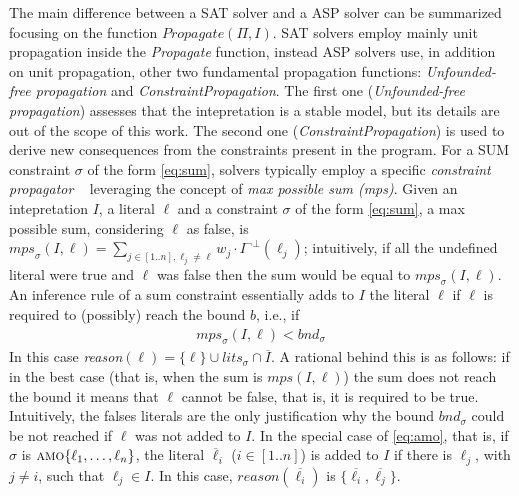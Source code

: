 The main difference between a SAT solver and a ASP solver can be summarized focusing on 
the function $\mathit{Propagate}(\Pi,I)$.
SAT solvers employ mainly unit propagation inside the \textit{Propagate} function,
instead ASP solvers use, in addition on unit propagation, other two fundamental  
propagation functions: \textit{Unfounded-free propagation} and \textit{ConstraintPropagation}.
The first one (\textit{Unfounded-free propagation}) assesses that the intepretation is a stable model, but its details
are out of the scope of this work.
The second one (\textit{ConstraintPropagation}) is used to derive new consequences from 
the constraints present in the program. 
For a SUM constraint $\sigma$ of the form \eqref{eq:sum},
solvers typically employ a 
specific \textit{constraint propagator}
~\cite{DBLP:conf/iclp/GebserKKS09,DBLP:journals/fuin/FaberLMR11} leveraging the concept of 
\textit{max possible sum (mps)}.
Given an intepretation $I$, a literal $\ell$ and a constraint $\sigma$ of the form \eqref{eq:sum}, 
a max possible sum, considering $\ell$ as false, is $\mathit{mps}_{\sigma}(I,\ell) = 
\sum_{j \in [1..n], \ell_j \neq \ell}{w_j \cdot I^{\neg\bot}(\ell_j)}$;
intuitively, if all the undefined literal were true and $\ell$ was false
then the sum would be equal to $\mathit{mps}_{\sigma}(I,\ell)$.
An inference rule of a sum constraint essentially adds to $I$ the literal $\ell$ 
if $\ell$ is required to (possibly) reach the bound $b$, i.e., if
\begin{align}\label{eq:sum:propagation}
    \mathit{mps}_{\sigma}(I,\ell) < \mathit{bnd}_{\sigma}
\end{align}
In this case \textit{reason}$(\ell) = \{\ell\} \cup lits_{\sigma} \cap \overline{I}$.
A rational behind this is as follows: if in the best case (that is, when the sum is $\mathit{mps}(I,\ell)$)
the sum does not reach the bound it means that $\ell$ cannot be false, that is, it is required to be true.
Intuitively, the falses literals are the only justification why the bound $\mathit{bnd}_{\sigma}$
could be not reached if $\ell$ was not added to $I$.
In the special case of \eqref{eq:amo}, that is, if $\sigma$ is $\textsc{amo}\{\ell_1, \ldots, \ell_n\}$, the literal $\overline{\ell}_i$ ($i \in [1..n]$) is added to $I$ if there is $\ell_j$, with $j \neq i$, such that $\ell_j \in I$.
In this case, $\mathit{reason}(\overline{\ell_i})$ is $\{\overline{\ell_i}, \overline{\ell_j}\}$.

